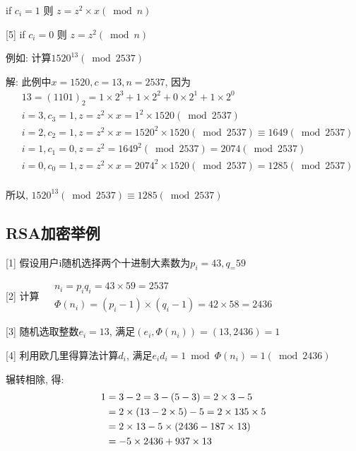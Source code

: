 \documentclass[UTF8]{ctexart}
\begin{document}
\begin{itemize}
        [4] if $c_i=1$ 则 $z=z^2\times x(\bmod n)$

        [5] if $c_i=0$ 则 $z=z^2(\bmod n)$

        例如: 计算$1520^{13}(\bmod 2537)$

        解: 此例中$x=1520, c=13, n=2537$, 因为
        $$
        \begin{aligned}
            &13=(1101)_2=1\times 2^3+1\times 2^2+0\times 2^1+1\times 2^0\\
            &i=3, c_3=1, z=z^2\times x=1^2\times 1520(\bmod 2537)\\
            &i=2, c_2=1, z=z^2\times x=1520^2\times 1520(\bmod 2537)\equiv 1649(\bmod 2537)\\
            &i=1, c_1=0, z=z^2 =1649^2(\bmod 2537)=2074(\bmod 2537)\\
            &i=0, c_0=1, z=z^2\times x=2074^2\times 1520(\bmod 2537)=1285(\bmod 2537)\\
        \end{aligned}
        $$

        所以, $1520^{13}(\bmod 2537)\equiv 1285(\bmod 2537)$
    \end{itemize}

    \subsection{RSA加密举例}

    [1] 假设用户i随机选择两个十进制大素数为$p_i=43, q_=59$

    [2] 计算
    $
    \begin{aligned}
        &n_i=p_iq_i=43\times 59=2537\\
        &\Phi(n_i)=(p_i-1)\times (q_i-1)=42\times 58=2436
    \end{aligned}
    $

    [3] 随机选取整数$e_i=13$, 满足$(e_i, \Phi(n_i))=(13, 2436)=1$

    [4] 利用欧几里得算法计算$d_i$, 满足$e_id_i=1\bmod \Phi(n_i)=1(\bmod 2436)$

    辗转相除, 得:
    $$
    \begin{aligned}
        1&=3-2=3-(5-3)=2\times 3-5\\
         &=2\times (13-2\times 5)-5=2\times 13\-5\times 5\\
         &=2\times 13 - 5\times (2436-187\times 13)\\
         &=-5\times 2436+937\times 13\\
    \end{aligned}
    $$
\end{document}
